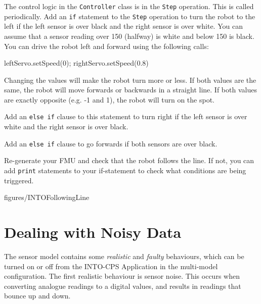 \documentclass[11pt,a4paper]{../tutorial}
\begin{document}
\begin{instructions}

\item The control logic in the \texttt{Controller} class is in the \texttt{Step} operation. This is called periodically. Add an \texttt{if} statement to the \texttt{Step} operation to turn the robot to the left if the left sensor is over black and the right sensor is over white. You can assume that a sensor reading over 150 (halfway) is white and below 150 is black. You can drive the robot left and forward using the following calls:

    \bigskip
    \begin{vdm}[style=styleVDM,basicstyle=\ttfamily\scriptsize,xleftmargin=0em]
    leftServo.setSpeed(0);
    rightServo.setSpeed(0.8)
    \end{vdm}

    Changing the values will make the robot turn more or less. If both values are the same, the robot will move forwards or backwards in a straight line. If both values are exactly opposite (e.g. -1 and 1), the robot will turn on the spot.

\item Add an \texttt{else if} clause to this statement to turn right if the left sensor is over white and the right sensor is over black.

\item Add an \texttt{else if} clause to go forwards if both sensors are over black.

\item Re-generate your FMU and check that the robot follows the line. If not, you can add \texttt{print} statements to your if-statement to check what conditions are being triggered.

    \begin{annotation}[width=0.85\linewidth,trim=0 0 0 150,clip]{figures/INTOFollowingLine}
    \end{annotation}
\end{instructions}


\section{Dealing with Noisy Data}

The sensor model contains some \emph{realistic} and \emph{faulty} behaviours, which can be turned on or off from the INTO-CPS Application in the multi-model configuration. The first realistic behaviour is sensor noise. This occurs when converting analogue readings to a digital values, and results in readings that bounce up and down.
\end{document}
